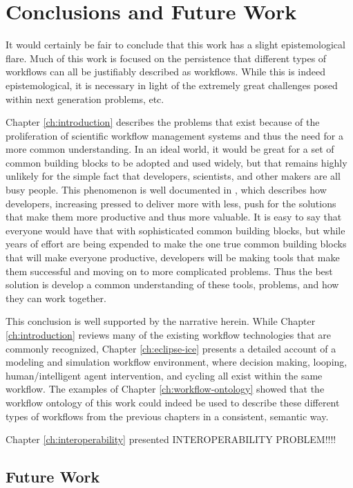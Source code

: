 \chapter{Conclusions and Future Work}\label{ch:conclusions}

It would certainly be fair to conclude that this work has a
slight epistemological flare. Much of this work is focused on the persistence
that different types of workflows can all be justifiably described as
workflows. While this is indeed epistemological, it is necessary in light
of the extremely great challenges posed within next generation problems, etc.

Chapter \ref{ch:introduction} describes the problems that exist because of the
proliferation of scientific workflow management systems and thus the need for a
more common understanding. In an ideal world, it would be great for a set of
common building blocks to be adopted and used widely, but that remains highly
unlikely for the simple fact that developers, scientists, and other makers are
all busy people. This phenomenon is well documented in \cite{ogrady_new_2013},
which describes how developers, increasing pressed to deliver more with less,
push for the solutions that make them more productive and thus more valuable. It
is easy to say that everyone would have that with sophisticated common building
blocks, but while years of effort are being expended to make the one true common
building blocks that will make everyone productive, developers will be making
tools that make them successful and moving on to more complicated problems. Thus
the best solution is develop a common understanding of these tools, problems,
and how they can work together.

This conclusion is well supported by the narrative herein. While Chapter
\ref{ch:introduction} reviews many of the existing workflow technologies that
are commonly recognized, Chapter \ref{ch:eclipse-ice} presents a detailed
account of a modeling and simulation workflow environment, where decision making, looping, human/intelligent agent intervention, and cycling all
exist within the same workflow. The examples of Chapter
\ref{ch:workflow-ontology} showed that the workflow ontology of this work could
indeed be used to describe these different types of workflows from the previous
chapters in a consistent, semantic way.

Chapter \ref{ch:interoperability} presented INTEROPERABILITY PROBLEM!!!!

\section{Future Work}

